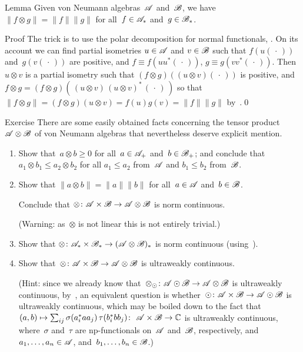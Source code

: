 \documentclass[a]{subfiles}
\begin{document}
\begin{parsec}%
\begin{point}{Lemma}%
Given von Neumann algebras~$\mathscr{A}$ and~$\mathscr{B}$,
we have $\|f\otimes g\|=\|f\|\|g\|$
for all~$f\in\mathscr{A}_*$ and~$g\in\mathscr{B}_*$.
\begin{point}{Proof}%
The trick is to use the polar decomposition
for normal functionals, .
On its account we can find partial isometries $u\in\mathscr{A}$
and $v\in\mathscr{B}$
such that
$f(u(\,\cdot\,))$
and~$g(v(\,\cdot\,))$ are positive,
and
$f\equiv f(uu^*(\,\cdot\,))$,  $g\equiv g(vv^*(\,\cdot\,))$.
Then $u\otimes v$ is a partial isometry
such that $(f\otimes g)((u\otimes v)(\,\cdot\,))$
is positive,
and $f\otimes g
= (f\otimes g)(\,(u\otimes v)\, (u\otimes v)^*\,(\,\cdot\,)\,)$
so that $\|f\otimes g\|=(f\otimes g)(u\otimes v)
= f(u)g(v)=\|f\|\|g\|$ by~.\qed
\end{point}
\end{point}
\begin{point}{Exercise}%
There are some easily obtained facts
concerning the tensor product~$\mathscr{A}\otimes\mathscr{B}$
of von Neumann algebras
that nevertheless deserve explicit mention.
\begin{enumerate}
\item
Show that~$a\otimes b\geq 0$
for all~$a\in\mathscr{A}_+$ and~$b\in\mathscr{B}_+$;
and conclude that $a_1\otimes b_1 \leq a_2\otimes b_2$
for all
$a_1\leq a_2$ from~$\mathscr{A}$ and $b_1\leq b_2$ from~$\mathscr{B}$.
\item
Show that $\|a\otimes b\| = \|a\|\|b\|$
for all~$a\in\mathscr{A}$ and~$b\in\mathscr{B}$.

Conclude that $\otimes\colon \mathscr{A}\times\mathscr{B}\to\mathscr{A}\otimes \mathscr{B}$
is norm continuous.

(Warning: as~$\otimes$ is not linear
this is not entirely trivial.)
\item
Show that $\otimes\colon \mathscr{A}_*\times\mathscr{B}_*\to(\mathscr{A}\otimes\mathscr{B})_*$
is norm continuous
(using~).
\item
Show that~$\otimes\colon \mathscr{A}\times \mathscr{B}\to \mathscr{A}\otimes \mathscr{B}$
is ultraweakly continuous.

(Hint: since we
already know that~$\otimes_\odot\colon \mathscr{A}\odot\mathscr{B}\to\mathscr{A}\otimes\mathscr{B}$
is ultraweakly continuous, by~,
an equivalent question 
is whether~$\odot\colon \mathscr{A}\times\mathscr{B}\to\mathscr{A}\odot\mathscr{B}$
is ultraweakly continuous,
which may be boiled down
to the fact
that $(a,b)\mapsto \sum_{ij} \sigma(a_i^* a a_j)\,\tau(b_i^* b b_j)\colon
\ \mathscr{A}\times \mathscr{B}\to\mathbb{C}$ is ultraweakly continuous,
where~$\sigma$ and~$\tau$ are np-functionals
on~$\mathscr{A}$ and~$\mathscr{B}$, respectively,
and
$a_1,\dotsc,a_n\in\mathscr{A}$, and~$b_1,\dotsc,b_n\in\mathscr{B}$.)


\end{enumerate}
\end{point}
\end{parsec}
\end{document}
